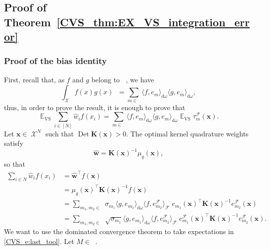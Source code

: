 \documentclass[twoside,11pt]{book}
\numberwithin{theorem}{chapter}
\numberwithin{definition}{chapter}
\numberwithin{proposition}{chapter}
\numberwithin{corollary}{chapter}
\numberwithin{example}{chapter}
\numberwithin{lemma}{chapter}
\numberwithin{assumption}{chapter}
\DeclareMathOperator{\Det}{Det}
\DeclareMathOperator{\VS}{\mathrm{VS}}
\DeclareMathOperator{\Tran}{\intercal}
\DeclareMathOperator{\EX}{\mathbb{E}}
\DeclareMathOperator{\F}{\mathcal{F}}
\DeclareMathOperator{\X}{\mathcal{X}}
\DeclareMathOperator{\Ltwo}{\mathbb{L}_{2}(\mathrm{d} \omega)}
\DeclareMathOperator{\Mu}{\mathrm{d}\omega(x)}
\DeclareMathOperator{\Ns}{\mathbb{N}^{*}}
\newcommand{\rb}[1]{\textcolor{magenta}{#1}}
\begin{document}
\subsection{Proof of Theorem~\ref{CVS_thm:EX_VS_integration_error}}\label{CVS_app:proof_bias}
\subsubsection{Proof of the bias identity}
First, recall that, as $f$ and $g$ belong to $\Ltwo$, we have
\begin{equation}
\int_{\X}f(x)g(x) \Mu = \sum\limits_{m \in \Ns} \langle f,e_{m}\rangle_{\mathrm{d}\omega} \langle g,e_{m}\rangle_{\mathrm{d}\omega},
\end{equation}
thus, in order to prove the result, it is enough to prove that
\begin{equation}\label{CVS_eq:EX_VS_optimal_quadrature_formula}
\EX_{\VS} \sum\limits_{i \in [N]} \widehat{w}_{i}f(x_{i}) = \sum\limits_{m \in \Ns} \langle f,e_{m} \rangle_{\mathrm{d}\omega} \langle g,e_{m} \rangle_{\mathrm{d}\omega} \EX_{\VS}\tau_{m}^{\F}(\bm{x}).
\end{equation}
Let $\bm{x} \in \X^{N}$ such that $\Det \bm{K}(\bm{x})>0$. The optimal kernel quadrature weights satisfy
\begin{equation}
\widehat{\bm{w}} = \bm{K}(\bm{x})^{-1}\mu_{g}(\bm{x}),
\end{equation}
so that
\begin{align}
\sum\limits_{i \in N} \widehat{w}_{i}f(x_{i}) & = \widehat{\bm{w}}^{\Tran} f(\bm{x}) \\
& = \mu_{g}(\bm{x})^{\Tran} \bm{K}(\bm{x})^{-1} f(\bm{x})\\
& = \sum_{m_{1},m_{2} \in \Ns} \sigma_{m_{1}} \langle g, e_{m_{1}} \rangle_{\mathrm{d}\omega} \langle f, e_{m_{2}}^{\F} \rangle_{\F} \; e_{m_{1}}(\bm{x})^{\Tran} \bm{K}(\bm{x})^{-1}e_{m_{2}}^{\F}(\bm{x}) \\
& = \sum\limits_{m_{1},m_{2} \in \Ns} \sqrt{\sigma_{m_{1}}} \langle g, e_{m_{1}} \rangle_{\mathrm{d}\omega}  \langle f, e_{m_{2}}^{\F} \rangle_{\F}\;  e_{m_{1}}^{\F}(\bm{x})^{\Tran} \bm{K}(\bm{x})^{-1}e_{m_{2}}^{\F}(\bm{x}).
\label{CVS_e:last_tool}
\end{align}
We want to use the dominated convergence theorem to take expectations in \eqref{CVS_e:last_tool}.
Let $M \in \Ns$.
\end{document}
